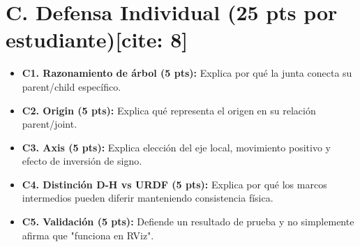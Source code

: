 \documentclass[11pt, a4paper]{article}
\begin{document}
\section*{C. Defensa Individual (25 pts por estudiante)[cite: 8]}
\begin{itemize}
    \item \textbf{C1. Razonamiento de árbol (5 pts):} Explica por qué la junta conecta su parent/child específico.
    \item \textbf{C2. Origin (5 pts):} Explica qué representa el origen en su relación parent/joint.
    \item \textbf{C3. Axis (5 pts):} Explica elección del eje local, movimiento positivo y efecto de inversión de signo.
    \item \textbf{C4. Distinción D-H vs URDF (5 pts):} Explica por qué los marcos intermedios pueden diferir manteniendo consistencia física.
    \item \textbf{C5. Validación (5 pts):} Defiende un resultado de prueba y no simplemente afirma que "funciona en RViz".
\end{itemize}
\end{document}
